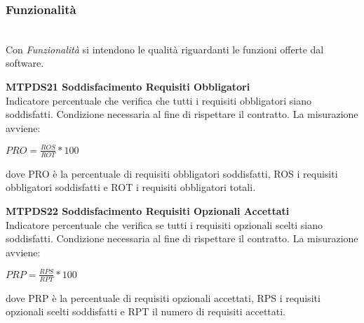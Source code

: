 \subsubsection{Funzionalità}\-\\
Con \textit{Funzionalità} si intendono le qualità riguardanti le funzioni offerte dal software.
\begin{itemize}
	\item \textbf{MTPDS21 Soddisfacimento Requisiti Obbligatori}\-\\
Indicatore percentuale che verifica che tutti i requisiti obbligatori siano soddisfatti. Condizione necessaria al fine di rispettare il contratto. La misurazione avviene:
\begin{center}
	\item $PRO = \frac{ROS}{ROT}*100$
\end{center}
dove PRO è la percentuale di requisiti obbligatori soddisfatti, ROS i requisiti obbligatori soddisfatti e ROT i requisiti obbligatori totali.

	\item \textbf{MTPDS22 Soddisfacimento Requisiti Opzionali Accettati}\-\\
Indicatore percentuale che verifica se tutti i requisiti opzionali scelti siano soddisfatti. Condizione necessaria al fine di rispettare il contratto. La misurazione avviene:
\begin{center}
	\item $PRP = \frac{RPS}{RPT}*100$
\end{center}
dove PRP è la percentuale di requisiti opzionali accettati, RPS i requisiti opzionali scelti soddisfatti e RPT il numero di requisiti accettati.
\end{itemize}

